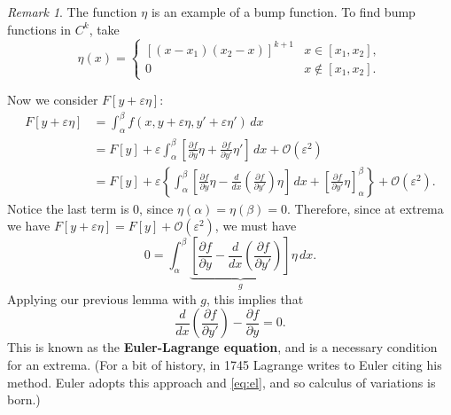 \documentclass[12pt]{article}
\theoremstyle{definition}
\theoremstyle{remark}
\newtheorem*{remark}{Remark}
\begin{document}
\begin{remark}
	The function $\eta$ is an example of a bump function. To find bump functions in $C^{k}$, take
	\[
		\eta(x) =
		\begin{cases}
			[(x - x_1)(x_2 - x)]^{k+1} & x \in [x_1, x_2], \\
			0 & x \not \in [x_1, x_2].
		\end{cases}
	\]
\end{remark}

Now we consider $F[y + \varepsilon \eta]$:
\begin{align*}
	F[y + \varepsilon \eta] &= \int_{\alpha}^{\beta} f(x, y + \varepsilon \eta, y' + \varepsilon \eta') \, dx \\
				&= F[y] + \varepsilon \int_{\alpha}^{\beta} \left[ \frac{\partial f}{\partial y} \eta + \frac{\partial f}{\partial y'} \eta' \right] \, dx + \mathcal{O}(\varepsilon^2) \\
				&= F[y] + \varepsilon \left\{ \int_{\alpha}^{\beta} \left[ \frac{\partial f}{\partial y} \eta - \frac{d}{dx} \left( \frac{\partial f}{\partial y'} \right) \eta \right] \, dx + \left[ \frac{\partial f}{\partial y'} \eta \right]_{\alpha}^{\beta} \right\} + \mathcal{O}(\varepsilon^2).
\end{align*}
Notice the last term is 0, since $\eta(\alpha) = \eta(\beta) = 0$. Therefore, since at extrema we have $F[y + \varepsilon \eta] = F[y] + \mathcal{O}(\varepsilon^2)$, we must have
\[
	0 = \int_{\alpha}^{\beta} \underbrace{\left[ \frac{\partial f}{\partial y} - \frac{d}{dx} \left( \frac{\partial f}{\partial y'} \right) \right]}_{g} \eta \, dx
.\]
Applying our previous lemma with $g$, this implies that
\[
	\frac{d}{dx} \left( \frac{\partial f}{\partial y'} \right) - \frac{\partial f}{\partial y} = 0 \tag{2}\label{eq:el}
.\]
This is known as the \textbf{Euler-Lagrange equation}, and is a necessary condition for an extrema. (For a bit of history, in 1745 Lagrange writes to Euler citing his method. Euler adopts this approach and \eqref{eq:el}, and so calculus of variations is born.)
\end{document}
